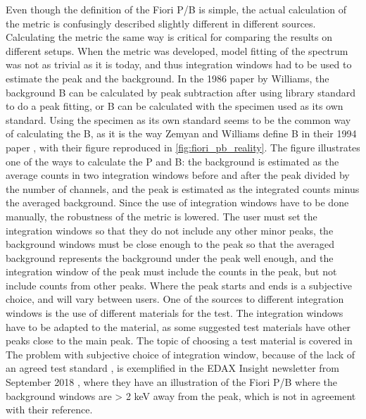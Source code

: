 Even though the definition of the Fiori P/B is simple, the actual calculation of the metric is confusingly described slightly different in different sources.
Calculating the metric the same way is critical for comparing the results on different setups.
When the metric was developed, model fitting of the spectrum was not as trivial as it is today, and thus integration windows had to be used to estimate the peak and the background.
In the 1986 paper by Williams, the background B can be calculated by peak subtraction after using library standard to do a peak fitting, or B can be calculated with the specimen used as its own standard.
Using the specimen as its own standard seems to be the common way of calculating the B, as it is the way Zemyan and Williams define B in their 1994 paper \cite{zemyan_standard_performance_1994}, with their figure reproduced in \cref{fig:fiori_pb_reality}.
The figure illustrates one of the ways to calculate the P and B: the background is estimated as the average counts in two integration windows before and after the peak divided by the number of channels, and the peak is estimated as the integrated counts minus the averaged background.
Since the use of integration windows have to be done manually, the robustness of the metric is lowered.
The user must set the integration windows so that they do not include any other minor peaks, the background windows must be close enough to the peak so that the averaged background represents the background under the peak well enough, and the integration window of the peak must include the counts in the peak, but not include counts from other peaks.
Where the peak starts and ends is a subjective choice, and will vary between users.
One of the sources to different integration windows is the use of different materials for the test.
The integration windows have to be adapted to the material, as some suggested test materials have other peaks close to the main peak.
The topic of choosing a test material is covered in 
The problem with subjective choice of integration window, because of the lack of an agreed test standard \cite{williams_standard_definitions_1986}, is exemplified in the EDAX Insight newsletter from September 2018 \cite{edax_insight_2018}, where they have an illustration of the Fiori P/B where the background windows are > 2 keV away from the peak, which is not in agreement with their reference.
